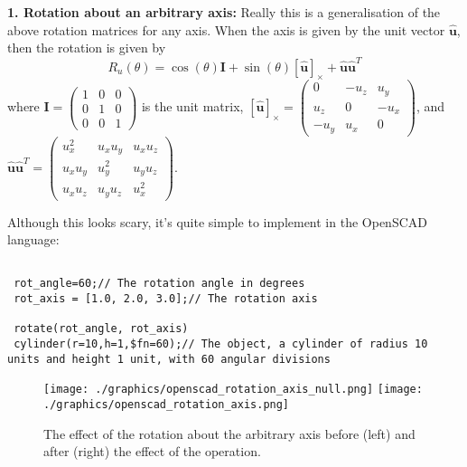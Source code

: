 \textbf{1. Rotation about an arbitrary axis: } Really this is a generalisation of the above rotation matrices for any axis. When the axis is given by the unit vector $\hat{\textbf{u}}$, then the rotation is given by 
\begin{equation}
 R_{u} \left(\theta \right) = \cos \left( \theta \right) \textbf{I} + \sin \left( \theta \right) \left[ \hat{\textbf{u}} \right]_{\times}  + \hat{\textbf{u}} \hat{\textbf{u}}^{T}
 \label{arb_rot_matrix}
\end{equation}
where $\textbf{I} = \begin{pmatrix} 1 & 0 & 0 \\ 0 & 1 & 0 \\ 0 & 0 & 1 \end{pmatrix}$ is the unit matrix, $\left[ \hat{\textbf{u}} \right]_{\times} = \begin{pmatrix} 0 & -u_{z} & u_{y} \\ u_{z} & 0 & -u_{x} \\ -u_{y} & u_{x} & 0 \end{pmatrix}$, and $\hat{\textbf{u}} \hat{\textbf{u}}^{T} = \begin{pmatrix} u_{x}^{2} & u_{x}u_{y} & u_{x}u_{z} \\ u_{x}u_{y} & u_{y}^{2} & u_{y}u_{z} \\ u_{x}u_{z} & u_{y}u_{z} & u_{x}^{2} \end{pmatrix}$. 


Although this looks scary, it's quite simple to implement in the OpenSCAD language:
\begin{verbatim}
 
 rot_angle=60;// The rotation angle in degrees
 rot_axis = [1.0, 2.0, 3.0];// The rotation axis

 rotate(rot_angle, rot_axis)
 cylinder(r=10,h=1,$fn=60);// The object, a cylinder of radius 10 units and height 1 unit, with 60 angular divisions

 \end{verbatim}

\begin{figure}[h]
 \centering
 \texttt{[image: ./graphics/openscad\_rotation\_axis\_null.png]}%
 \hspace{0.1cm}\texttt{[image: ./graphics/openscad\_rotation\_axis.png]}
 \caption{The effect of the rotation about the arbitrary axis before (left) and after (right) the effect of the operation.}
\end{figure}

